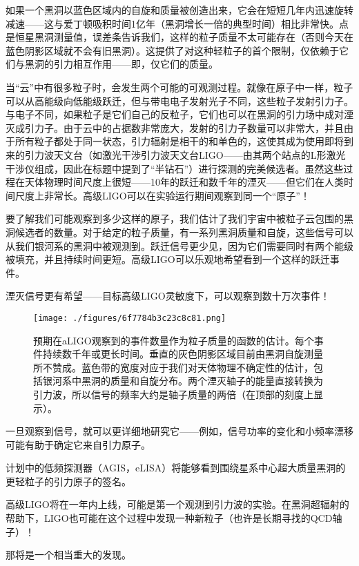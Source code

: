 如果一个黑洞以蓝色区域内的自旋和质量被创造出来，它会在短短几年内迅速旋转减速——这与爱丁顿吸积时间1亿年（黑洞增长一倍的典型时间）相比非常快。点是恒星黑洞测量值，误差条告诉我们，这样的粒子质量不太可能存在（否则今天在蓝色阴影区域就不会有旧黑洞）。这提供了对这种轻粒子的首个限制，仅依赖于它们与黑洞的引力相互作用——即，仅它们的质量。

当“云”中有很多粒子时，会发生两个可能的可观测过程。就像在原子中一样，粒子可以从高能级向低能级跃迁，但与带电电子发射光子不同，这些粒子发射引力子。与电子不同，如果粒子是它们自己的反粒子，它们也可以在黑洞的引力场中成对湮灭成引力子。由于云中的占据数非常庞大，发射的引力子数量可以非常大，并且由于所有粒子都处于同一状态，引力辐射是相干的和单色的，这使其成为使用即将到来的引力波天文台（如激光干涉引力波天文台LIGO——由其两个站点的L形激光干涉仪组成，因此在标题中提到了“半钻石”）进行探测的完美候选者。虽然这些过程在天体物理时间尺度上很短——10年的跃迁和数千年的湮灭——但它们在人类时间尺度上非常长。高级LIGO可以在实验运行期间观察到同一个“原子”！

要了解我们可能观察到多少这样的原子，我们估计了我们宇宙中被粒子云包围的黑洞候选者的数量。对于给定的粒子质量，有一系列黑洞质量和自旋，这些信号可以从我们银河系的黑洞中被观测到。跃迁信号更少见，因为它们需要同时有两个能级被填充，并且持续时间更短。高级LIGO可以乐观地希望看到一个这样的跃迁事件。

湮灭信号更有希望——目标高级LIGO灵敏度下，可以观察到数十万次事件！

\begin{figure}[ht]
\centering
\texttt{[image: ./figures/6f7784b3c23c8c81.png]}
\caption{预期在aLIGO观察到的事件数量作为粒子质量的函数的估计。每个事件持续数千年或更长时间。垂直的灰色阴影区域目前由黑洞自旋测量所不赞成。蓝色带的宽度对应于我们对天体物理不确定性的估计，包括银河系中黑洞的质量和自旋分布。两个湮灭轴子的能量直接转换为引力波，所以信号的频率大约是轴子质量的两倍（在顶部的刻度上显示）。} \label{fig_GAtom_4}
\end{figure}


一旦观察到信号，就可以更详细地研究它——例如，信号功率的变化和小频率漂移可能有助于确定它来自引力原子。

计划中的低频探测器（AGIS，eLISA）将能够看到围绕星系中心超大质量黑洞的更轻粒子的引力原子的签名。

高级LIGO将在一年内上线，可能是第一个观测到引力波的实验。在黑洞超辐射的帮助下，LIGO也可能在这个过程中发现一种新粒子（也许是长期寻找的QCD轴子）！

那将是一个相当重大的发现。





